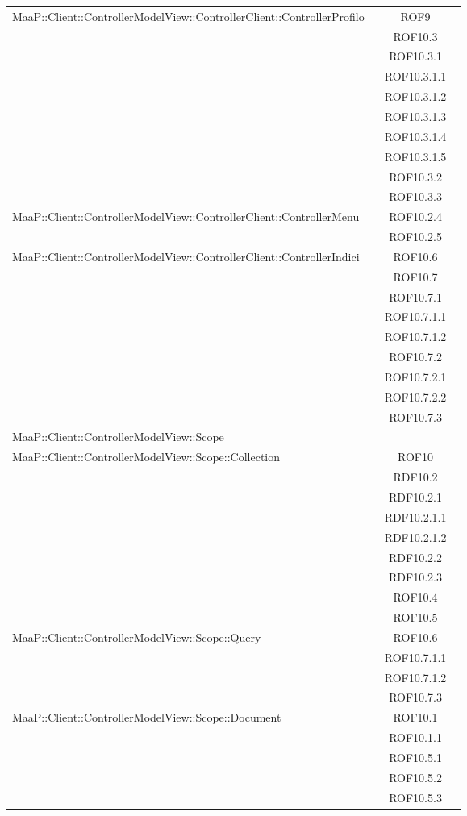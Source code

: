 \begin{center}
\begin{longtable}{|p{0.8\linewidth}|c|}
\midrule 
MaaP::Client::ControllerModelView::ControllerClient::ControllerProfilo
& ROF9\\
& ROF10.3\\
& ROF10.3.1\\
& ROF10.3.1.1\\
& ROF10.3.1.2\\
& ROF10.3.1.3\\
& ROF10.3.1.4\\
& ROF10.3.1.5\\
& ROF10.3.2\\
& ROF10.3.3\\


\midrule 
MaaP::Client::ControllerModelView::ControllerClient::ControllerMenu
& ROF10.2.4\\
& ROF10.2.5\\

\midrule 
MaaP::Client::ControllerModelView::ControllerClient::ControllerIndici
& ROF10.6\\
& ROF10.7\\
& ROF10.7.1\\
& ROF10.7.1.1\\
& ROF10.7.1.2\\
& ROF10.7.2\\
& ROF10.7.2.1\\
& ROF10.7.2.2\\
& ROF10.7.3\\


\midrule 
MaaP::Client::ControllerModelView::Scope
& \\

\midrule 
MaaP::Client::ControllerModelView::Scope::Collection
& ROF10\\
& RDF10.2\\
& RDF10.2.1\\
& RDF10.2.1.1\\
& RDF10.2.1.2\\
& RDF10.2.2\\
& RDF10.2.3\\
& ROF10.4\\
& ROF10.5\\

\midrule 
MaaP::Client::ControllerModelView::Scope::Query
& ROF10.6\\
& ROF10.7.1.1\\
& ROF10.7.1.2\\
& ROF10.7.3\\

\midrule 
MaaP::Client::ControllerModelView::Scope::Document
& ROF10.1\\
& ROF10.1.1\\
& ROF10.5.1\\
& ROF10.5.2\\
& ROF10.5.3\\



\end{longtable}
\end{center}
